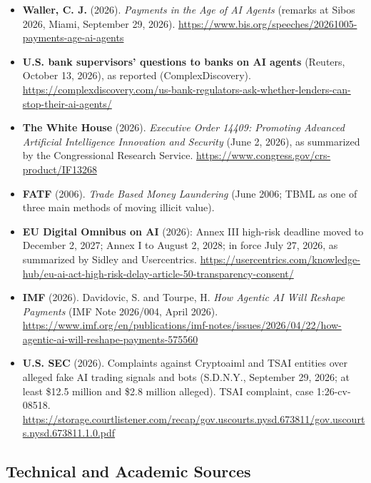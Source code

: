 \documentclass[11pt,letterpaper]{article}
\begin{document}
\begin{itemize}[leftmargin=1.5em]
  \item \textbf{Waller, C. J.} (2026). \textit{Payments in the Age of AI Agents} (remarks at Sibos 2026, Miami, September 29, 2026). \url{https://www.bis.org/speeches/20261005-payments-age-ai-agents}
  \item \textbf{U.S. bank supervisors' questions to banks on AI agents} (Reuters, October 13, 2026), as reported (ComplexDiscovery). \url{https://complexdiscovery.com/us-bank-regulators-ask-whether-lenders-can-stop-their-ai-agents/}
  \item \textbf{The White House} (2026). \textit{Executive Order 14409: Promoting Advanced Artificial Intelligence Innovation and Security} (June 2, 2026), as summarized by the Congressional Research Service. \url{https://www.congress.gov/crs-product/IF13268}
  \item \textbf{FATF} (2006). \textit{Trade Based Money Laundering} (June 2006; TBML as one of three main methods of moving illicit value).
  \item \textbf{EU Digital Omnibus on AI} (2026): Annex III high-risk deadline moved to December 2, 2027; Annex I to August 2, 2028; in force July 27, 2026, as summarized by Sidley and Usercentrics. \url{https://usercentrics.com/knowledge-hub/eu-ai-act-high-risk-delay-article-50-transparency-consent/}
  \item \textbf{IMF} (2026). Davidovic, S. and Tourpe, H. \textit{How Agentic AI Will Reshape Payments} (IMF Note 2026/004, April 2026). \url{https://www.imf.org/en/publications/imf-notes/issues/2026/04/22/how-agentic-ai-will-reshape-payments-575560}
  \item \textbf{U.S. SEC} (2026). Complaints against Cryptoaiml and TSAI entities over alleged fake AI trading signals and bots (S.D.N.Y., September 29, 2026; at least \$12.5 million and \$2.8 million alleged). TSAI complaint, case 1:26-cv-08518. \url{https://storage.courtlistener.com/recap/gov.uscourts.nysd.673811/gov.uscourts.nysd.673811.1.0.pdf}
\end{itemize}

\subsection*{Technical and Academic Sources}
\end{document}
